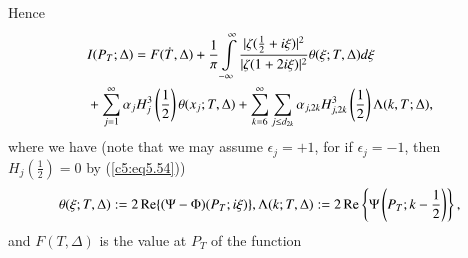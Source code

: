 Hence
\begin{align}
&  I(P_T; \Delta) = F(\dot{T},\Delta) + \frac{1}{\pi}
  \int\limits^\infty_{-\infty} \frac{|\zeta(\frac{1}{2} + i
    \xi)|^2}{|\zeta(1+2i\xi)|^2} \theta (\xi; T, \Delta) d \xi 
\label{c5:eq5.109}\\
& + \sum\limits^\infty_{j=1}\alpha_j H^3_j \left(\frac{1}{2} \right)
\theta (x_j; T,\Delta) + \sum\limits^\infty_{k=6} \sum\limits_{j \leq
  d_{2k} } \alpha_{j,2k} H^3_{j,2k} \left(\frac{1}{2} \right) \Lambda
(k,T;\Delta), \notag
\end{align}
where we have (note that we may assume $\epsilon_j = +1$, for if
$\epsilon_j = - 1$, then $H_j(\frac{1}{2}) = 0$ by (\ref{c5:eq5.54})) 
{\fontsize{9pt}{11pt}\selectfont
\begin{equation}
\theta (\xi; T,\Delta): = 2 \operatorname{Re} \{(\Psi - \Phi) (P_T; i\xi)\}, \Lambda
(k;T,\Delta):= 2 \operatorname{Re} \left\{\Psi \left(P_T;k -\frac{1}{2} \right)
\right\}, \label{c5:eq5.110} 
\end{equation}}
and $F(T,\Delta)$ is the value at $P_T$ of the function
